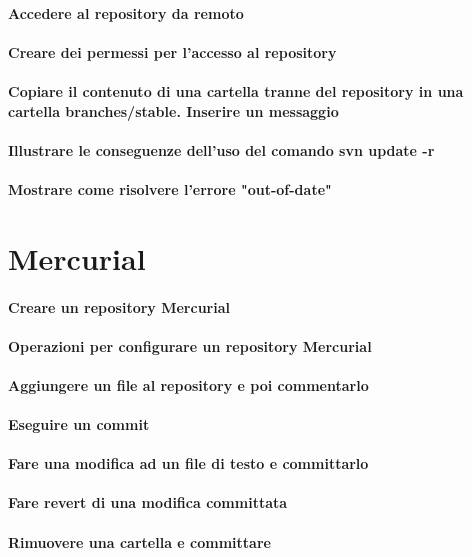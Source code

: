 \documentclass[a4paper]{article}
\begin{document}
	\paragraph{Accedere al repository da remoto}
	
	\paragraph{Creare dei permessi per l'accesso al repository}
	
	\paragraph{Copiare il contenuto di una cartella tranne del repository in una cartella branches/stable. Inserire un messaggio}
	
	\paragraph{Illustrare le conseguenze dell'uso del comando svn update -r}
	
	\paragraph{Mostrare come risolvere l'errore "out-of-date"}	
	
	
	
	\section{Mercurial} %
	
	\paragraph{Creare un repository Mercurial}
	
	\paragraph{Operazioni per configurare un repository Mercurial}
	
	\paragraph{Aggiungere un file al repository e poi commentarlo}	
	
	\paragraph{Eseguire un commit}
	
	\paragraph{Fare una modifica ad un file di testo e committarlo}
	
	\paragraph{Fare revert di una modifica committata}
	
	\paragraph{Rimuovere una cartella e committare}
	
	
	
\end{document}
